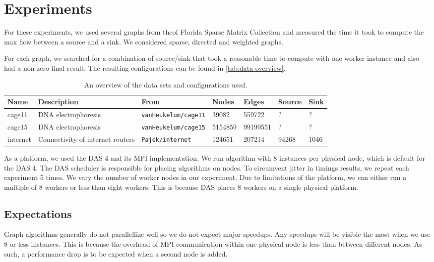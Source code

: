 \chapter{Experiments}
\label{chp:experiments}

For these experiments, we used several graphs from theof Florida Sparse Matrix Collection \cite{FloridaSparseMatrix}  and measured the time it took to compute the max flow between a source and a sink. We considered sparse, directed and weighted graphs.

For each graph, we searched for a combination of source/sink that took a reasonable time to compute with one worker instance and also had a non-zero final result. The resulting configurations can be found in \autoref{tab:data-overview}.

\begin{table}
	\centering

	\begin{tabularx}{\textwidth}{l | X | l | l | l | l | l}
		Name & Description & From & Nodes & Edges & Source & Sink \\
		\hline
		cage11 & DNA electrophoresis & \texttt{vanHeukelum/cage11} & 39082 & 559722 & ? & ? \\
		cage15 & DNA electrophoresis & \texttt{vanHeukelum/cage15} & 5154859 & 99199551 & ? & ? \\
		internet & Connectivity of internet routers & \texttt{Pajek/internet} & 124651 & 207214 & 94268 & 1046
	\end{tabularx}
	\caption{An overview of the data sets and configurations used.}
	\label{tab:data-overview}
\end{table}

As a platform, we used the DAS 4 and its MPI implementation. We run algorithm with 8 instances per physical node, which is default for the DAS 4. %
The DAS scheduler is responsible for placing algorithms on nodes. To circumvent jitter in timings results, we repeat each experiment 5 times. We vary the number of worker nodes in our experiment. Due to limitations of the platform, we can either run a multiple of 8 workers or less than eight workers. This is because DAS places 8 workers on a single physical platform.


\section{Expectations}

Graph algorithms generally do not parallellize well %
so we do not expect major speedups. Any speedups will be visible the most when we use 8 or less instances. This is because the overhead of MPI communication within one physical node is less than between different nodes. As such, a performance drop is to be expected when a second node is added.

